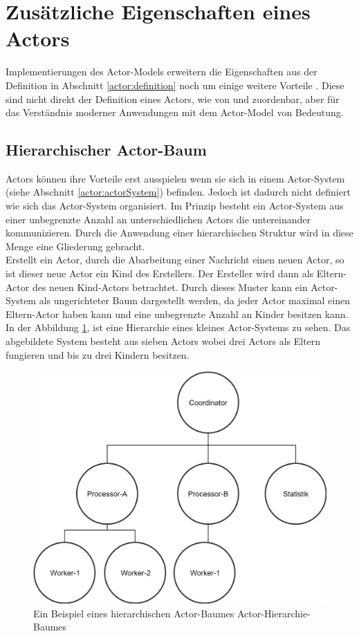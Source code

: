 \section{Zusätzliche Eigenschaften eines Actors}
Implementierungen des Actor-Models erweitern die Eigenschaften aus der Definition in Abschnitt \ref{actor:definition} noch um einige weitere Vorteile \citep{Vernon2015ReactiveAkka}. Diese sind nicht direkt der Definition eines Actors, wie von \cite{Hewitt1973AIntelligence} und \cite{Agha1985ActorsSystems} zuordenbar, aber für das Verständnis moderner Anwendungen mit dem Actor-Model von Bedeutung.
\subsection{Hierarchischer Actor-Baum}
Actors können ihre Vorteile erst ausspielen wenn sie sich in einem Actor-System (siehe Abschnitt \ref{actor:actorSystem}) befinden. Jedoch ist dadurch nicht definiert wie sich das Actor-System organisiert. Im Prinzip besteht ein Actor-System aus einer unbegrenzte Anzahl an unterschiedlichen Actors die untereinander kommunizieren. Durch die Anwendung einer hierarchischen Struktur wird in diese Menge eine Gliederung gebracht. \\
Erstellt ein Actor, durch die Abarbeitung einer Nachricht einen neuen Actor, so ist dieser neue Actor ein Kind des Erstellers. Der Ersteller wird dann als Eltern-Actor des neuen Kind-Actors betrachtet. Durch dieses Muster kann ein Actor-System als ungerichteter Baum dargestellt werden, da jeder Actor maximal einen Eltern-Actor haben kann und eine unbegrenzte Anzahl an Kinder besitzen kann. \\
In der Abbildung \ref{fig:actor:actorHierarchySample}, ist eine Hierarchie eines kleines Actor-Systems zu sehen. Das abgebildete System besteht aus sieben Actors wobei drei Actors als Eltern fungieren und bis zu drei Kindern besitzen. 
\begin{figure}
  \centering
  \includegraphics[width=0.6\linewidth]{gfx/actor/actorHierarchy}
  \caption{Ein Beispiel eines hierarchischen Actor-Baumes Actor-Hierarchie-Baumes}
  \label{fig:actor:actorHierarchySample}
\end{figure}

